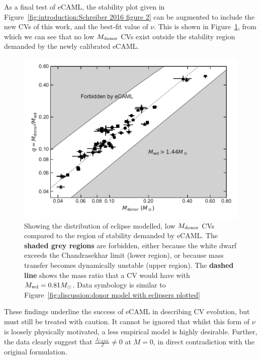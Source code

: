 As a final test of eCAML, the stability plot given in Figure~\ref{fig:introduction:Schreiber 2016 figure 2} can be augmented to include the new CVs of this work, and the best-fit value of $\nu$.
This is shown in Figure~\ref{fig:discussion:calibrated eCAML}, from which we can see that no low $M_{\rm donor}$ CVs exist outside the stability region demanded by the newly calibrated eCAML.
\begin{figure}
    \centering
    \includegraphics[width=\textwidth]{figures/results/Mdot/ecaml_nointercept.pdf}
    \caption{Showing the distribution of eclipse modelled, low $M_{\rm donor}$ CVs compared to the region of stability demanded by eCAML. The {\bf shaded grey regions} are forbidden, either because the white dwarf exceeds the Chandrasekhar limit (lower region), or because mass transfer becomes dynamically unstable (upper region). The {\bf dashed line} shows the mass ratio that a CV would have with $M_{\rm wd} = 0.81 M_\odot$. Data symbology is similar to Figure~\ref{fig:discussion:donor model with eclipsers plotted}}
    \label{fig:discussion:calibrated eCAML}
\end{figure}
These findings underline the success of eCAML in describing CV evolution, but must still be treated with caution. It cannot be ignored that whilst this form of $\nu$ is loosely physically motivated, a less empirical model is highly desirable.
Further, the data clearly suggest that $\frac{\dot J_{CAML}}{J} \neq 0$ at $\dot M = 0$, in direct contradiction with the original formulation. 

